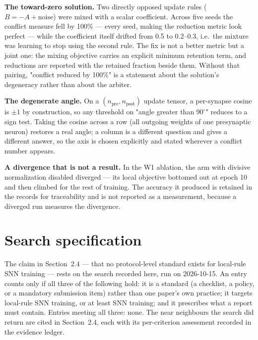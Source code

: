 \documentclass[11pt]{article}
\begin{document}
\textbf{The toward-zero solution.} Two directly opposed update rules
($B = -A + \text{noise}$) were mixed with a scalar coefficient. Across five seeds
the conflict measure fell by 100\% --- every seed, making the reduction metric
look perfect --- while the coefficient itself drifted from 0.5 to 0.2--0.3,
i.e.\ the mixture was learning to stop using the second rule. The fix is not a
better metric but a joint one: the mixing objective carries an explicit minimum
retention term, and reductions are reported with the retained fraction beside
them. Without that pairing, "conflict reduced by 100\%" is a statement about the
solution's degeneracy rather than about the arbiter.

\textbf{The degenerate angle.} On a $(n_{\text{pre}}, n_{\text{post}})$ update
tensor, a per-synapse cosine is $\pm 1$ by construction, so any threshold on
"angle greater than $90^\circ$" reduces to a sign test. Taking the cosine across
a row (all outgoing weights of one presynaptic neuron) restores a real angle; a
column is a different question and gives a different answer, so the axis is
chosen explicitly and stated wherever a conflict number appears.

\textbf{A divergence that is not a result.} In the W1 ablation, the arm with
divisive normalization disabled diverged --- its local objective bottomed out at
epoch 10 and then climbed for the rest of training. The accuracy it produced is
retained in the records for traceability and is not reported as a measurement,
because a diverged run measures the divergence.

\section{Search specification}
\label{app:search}
The claim in Section~2.4 --- that no protocol-level standard exists for local-rule
SNN training --- rests on the search recorded here, run on 2026-10-15. An entry
counts only if all three of the following hold: it is a standard (a checklist, a
policy, or a mandatory submission item) rather than one paper's own practice; it
targets local-rule SNN training, or at least SNN training; and it prescribes what
a report must contain. Entries meeting all three: none. The near neighbours the
search did return are cited in Section~2.4, each with its per-criterion assessment
recorded in the evidence ledger.
\end{document}
